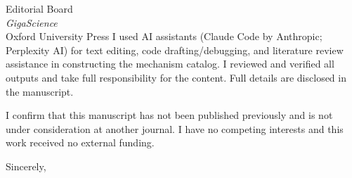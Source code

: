 \documentclass[11pt]{letter}
\begin{document}
\begin{letter}{Editorial Board \\ \emph{GigaScience} \\ Oxford University Press}
I used AI assistants (Claude Code by Anthropic; Perplexity AI) for text editing, code drafting/debugging, and literature review assistance in constructing the mechanism catalog. I reviewed and verified all outputs and take full responsibility for the content. Full details are disclosed in the manuscript.

I confirm that this manuscript has not been published previously and is not under consideration at another journal. I have no competing interests and this work received no external funding.

\closing{Sincerely,}

\end{letter}
\end{document}
